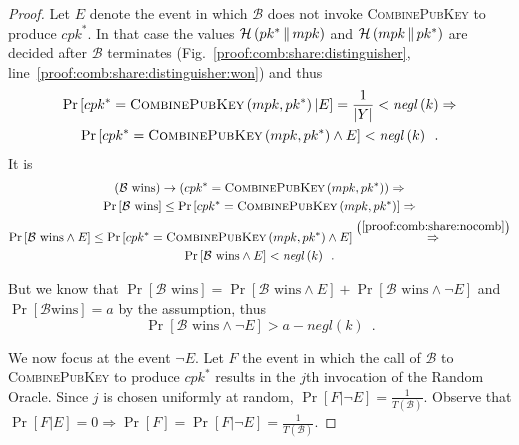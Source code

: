 \begin{proof}
      Let $E$ denote the event in which $\mathcal{B}$ does not invoke
      \textsc{CombinePubKey} to produce $cpk^*$. In that case the values
      $\mathcal{H}\left(pk^* \,\|\, mpk\right)$ and $\mathcal{H}\left(mpk
      \,\|\, pk^*\right)$ are decided after $\mathcal{B}$ terminates
      (Fig.~\ref{proof:comb:share:distinguisher},
      line~\ref{proof:comb:share:distinguisher:won}) and thus
      \begin{equation}
        \begin{gathered}
          \Pr\left[cpk^* = \textsc{CombinePubKey}\left(mpk, pk^*\right) |
          E\right] = \frac{1}{|Y|} < \mathit{negl}\left(k\right) \Rightarrow \\
          \Pr\left[cpk^* = \textsc{CombinePubKey}\left(mpk, pk^*\right)
          \wedge E\right] < \mathit{negl}\left(k\right) \enspace.
        \end{gathered}
        \label{proof:comb:share:nocomb}
      \end{equation}
      It is
      \begin{gather*}
        \left(\mathcal{B} \text{ wins}\right) \rightarrow \left(cpk^* =
        \textsc{CombinePubKey}\left(mpk, pk^*\right)\right) \Rightarrow \\
        \Pr\left[\mathcal{B} \text{ wins}\right] \leq \Pr\left[cpk^* =
        \textsc{CombinePubKey}\left(mpk, pk^*\right)\right] \Rightarrow \\
        \Pr\left[\mathcal{B} \text{ wins} \wedge E\right] \leq \Pr\left[cpk^* =
        \textsc{CombinePubKey}\left(mpk, pk^*\right) \wedge E\right]
        \overset{\left(\ref{proof:comb:share:nocomb}\right)}{\Rightarrow} \\
        \Pr\left[\mathcal{B} \text{ wins} \wedge E\right] <
        \mathit{negl}\left(k\right) \enspace.
      \end{gather*}

      But we know that $\Pr\left[\mathcal{B} \text{ wins}\right] =
      \Pr\left[\mathcal{B} \text{ wins} \wedge E\right] + \Pr\left[\mathcal{B}
      \text{ wins} \wedge \neg E\right]$ and $\Pr\left[\mathcal{B} \text{
      wins}\right] = a$ by the assumption, thus
      \begin{equation}
        \label{proof:comb:share:nohash}
        \Pr\left[\mathcal{B} \text{ wins} \wedge \neg E\right] > a -
        \mathit{negl}\left(k\right) \enspace.
      \end{equation}

      We now focus at the event $\neg E$. Let $F$ the event in which the call of
      $\mathcal{B}$ to \textsc{CombinePubKey} to produce $cpk^*$ results in
      the $j$th invocation of the Random Oracle. Since $j$ is chosen uniformly
      at random, $\Pr\left[F | \neg E\right] =
      \frac{1}{T\left(\mathcal{B}\right)}$. Observe that $\Pr\left[F | E\right]
      = 0 \Rightarrow \Pr\left[F\right] = \Pr\left[F | \neg E\right] =
      \frac{1}{T\left(\mathcal{B}\right)}$.


\end{proof}
